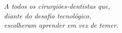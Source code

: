 
\begin{dedicatoria}
  \vspace*{\fill}
  \begin{flushright}
    \textit{A todos os cirurgiões-dentistas que, \\
    diante do desafio tecnológico, \\
    escolheram aprender em vez de temer.}
  \end{flushright}
\end{dedicatoria}
